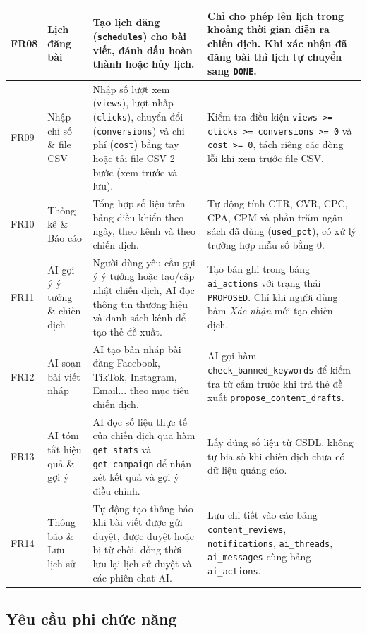 \begin{small}
\begin{longtable}{|C{0.9cm}|L{2.3cm}|L{4.8cm}|L{5.7cm}|}
\hline
FR08 & Lịch đăng bài & Tạo lịch đăng (\texttt{schedules}) cho bài viết, đánh dấu hoàn thành hoặc hủy lịch. & Chỉ cho phép lên lịch trong khoảng thời gian diễn ra chiến dịch. Khi xác nhận đã đăng bài thì lịch tự chuyển sang \texttt{DONE}.\\
\hline
FR09 & Nhập chỉ số \& file CSV & Nhập số lượt xem (\texttt{views}), lượt nhấp (\texttt{clicks}), chuyển đổi (\texttt{conversions}) và chi phí (\texttt{cost}) bằng tay hoặc tải file CSV 2 bước (xem trước và lưu). & Kiểm tra điều kiện \texttt{views >= clicks >= conversions >= 0} và \texttt{cost >= 0}, tách riêng các dòng lỗi khi xem trước file CSV.\\
\hline
FR10 & Thống kê \& Báo cáo & Tổng hợp số liệu trên bảng điều khiển theo ngày, theo kênh và theo chiến dịch. & Tự động tính CTR, CVR, CPC, CPA, CPM và phần trăm ngân sách đã dùng (\texttt{used\_pct}), có xử lý trường hợp mẫu số bằng 0.\\
\hline
FR11 & AI gợi ý ý tưởng \& chiến dịch & Người dùng yêu cầu gợi ý ý tưởng hoặc tạo/cập nhật chiến dịch, AI đọc thông tin thương hiệu và danh sách kênh để tạo thẻ đề xuất. & Tạo bản ghi trong bảng \texttt{ai\_actions} với trạng thái \texttt{PROPOSED}. Chỉ khi người dùng bấm \textit{Xác nhận} mới tạo chiến dịch.\\
\hline
FR12 & AI soạn bài viết nháp & AI tạo bản nháp bài đăng Facebook, TikTok, Instagram, Email... theo mục tiêu chiến dịch. & AI gọi hàm \texttt{check\_banned\_keywords} để kiểm tra từ cấm trước khi trả thẻ đề xuất \texttt{propose\_content\_drafts}.\\
\hline
FR13 & AI tóm tắt hiệu quả \& gợi ý & AI đọc số liệu thực tế của chiến dịch qua hàm \texttt{get\_stats} và \texttt{get\_campaign} để nhận xét kết quả và gợi ý điều chỉnh. & Lấy đúng số liệu từ CSDL, không tự bịa số khi chiến dịch chưa có dữ liệu quảng cáo.\\
\hline
FR14 & Thông báo \& Lưu lịch sử & Tự động tạo thông báo khi bài viết được gửi duyệt, được duyệt hoặc bị từ chối, đồng thời lưu lại lịch sử duyệt và các phiên chat AI. & Lưu chi tiết vào các bảng \texttt{content\_reviews}, \texttt{notifications}, \texttt{ai\_threads}, \texttt{ai\_messages} cùng bảng \texttt{ai\_actions}.\\
\hline
\end{longtable}
\end{small}

\subsection{Yêu cầu phi chức năng}

